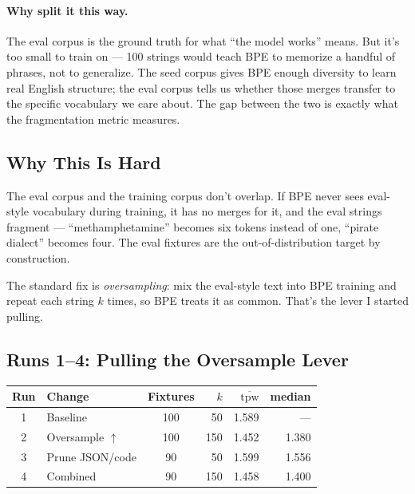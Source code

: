 \paragraph{Why split it this way.} The eval corpus is the ground truth
for what ``the model works'' means. But it's too small to train on ---
100 strings would teach BPE to memorize a handful of phrases, not to
generalize. The seed corpus gives BPE enough diversity to learn real
English structure; the eval corpus tells us whether those merges
transfer to the specific vocabulary we care about. The gap between the
two is exactly what the fragmentation metric measures.

\subsection*{Why This Is Hard}

The eval corpus and the training corpus don't overlap. If BPE never
sees eval-style vocabulary during training, it has no merges for it,
and the eval strings fragment --- ``methamphetamine'' becomes six
tokens instead of one, ``pirate dialect'' becomes four. The eval
fixtures are the out-of-distribution target by construction.

The standard fix is \textit{oversampling}: mix the eval-style text into
BPE training and repeat each string $k$ times, so BPE treats it as
common. That's the lever I started pulling.

\subsection*{Runs 1--4: Pulling the Oversample Lever}

\begin{center}
    \begin{tabular}{clcrrr}
        \toprule
        Run & Change                & Fixtures & $k$ & $\overline{\text{tpw}}$ & median \\
        \midrule
        1   & Baseline              & 100      & 50  & 1.589                   & ---    \\
        2   & Oversample $\uparrow$ & 100      & 150 & 1.452                   & 1.380  \\
        3   & Prune JSON/code       & 90       & 50  & 1.599                   & 1.556  \\
        4   & Combined              & 90       & 150 & 1.458                   & 1.400  \\
        \bottomrule
    \end{tabular}
\end{center}

